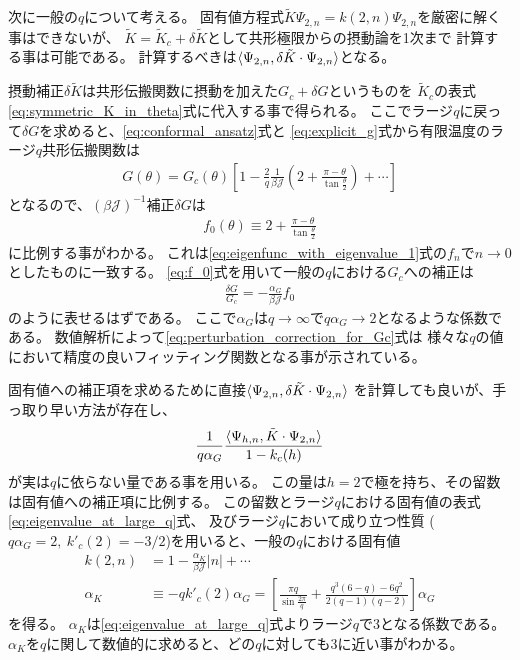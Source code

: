 次に一般の$q$について考える。
固有値方程式$\tilde{K} \Psi_{2,n} = k(2, n)\Psi_{2,n}$を厳密に解く事はできないが、
$\tilde{K} = \tilde{K}_c + \delta\tilde{K}$として共形極限からの摂動論を1次まで
計算する事は可能である。
計算するべきは$\langle \Psi_{2,n}, \delta\tilde{K}\cdot\Psi_{2,n} \rangle$となる。

摂動補正$\delta\tilde{K}$は共形伝搬関数に摂動を加えた$G_c + \delta G$というものを
$\tilde{K}_c$の表式\eqref{eq:symmetric_K_in_theta}式に代入する事で得られる。
ここでラージ$q$に戻って$\delta G$を求めると、\eqref{eq:conformal_ansatz}式と
\eqref{eq:explicit_g}式から有限温度のラージ$q$共形伝搬関数は
\begin{align}
	G(\theta) = G_c(\theta)\left[
		1 - \frac{2}{q}\frac{1}{\beta\mathcal{J}}
		\left(2 + \frac{\pi - \theta}{\tan\frac{\theta}{2}}\right) + \cdots
	\right]
\end{align}
となるので、$(\beta\mathcal{J})^{-1}$補正$\delta G$は
\begin{align}
	f_0(\theta) \equiv 2 + \frac{\pi - \theta}{\tan\frac{\theta}{2}}
	\label{eq:f_0}
\end{align}
に比例する事がわかる。
これは\eqref{eq:eigenfunc_with_eigenvalue_1}式の$f_n$で$n\to 0$としたものに一致する。
\eqref{eq:f_0}式を用いて一般の$q$における$G_c$への補正は
\begin{align}
	\frac{\delta G}{G_c} = -\frac{\alpha_G}{\beta\mathcal{J}}f_0
	\label{eq:perturbation_correction_for_Gc}
\end{align}
のように表せるはずである。
ここで$\alpha_G$は$q\to\infty$で$q\alpha_G\to 2$となるような係数である。
数値解析によって\eqref{eq:perturbation_correction_for_Gc}式は
様々な$q$の値において精度の良いフィッティング関数となる事が示されている\cite{maldacena}。

固有値への補正項を求めるために直接$\langle \Psi_{2,n}, \delta\tilde{K}\cdot\Psi_{2,n} \rangle$
を計算しても良いが、手っ取り早い方法が存在し、
\begin{align}
	\frac{1}{q\alpha_G}\frac{\langle \Psi_{h,n}, \tilde{K}\cdot\Psi_{2,n} \rangle}{1-k_c(h)}
\end{align}
が実は$q$に依らない量である事を用いる\cite{maldacena}。
この量は$h=2$で極を持ち、その留数は固有値への補正項に比例する。
この留数とラージ$q$における固有値の表式\eqref{eq:eigenvalue_at_large_q}式、
及びラージ$q$において成り立つ性質
($q\alpha_G = 2,\ k'_c(2) = -3/2$)を用いると、一般の$q$における固有値
\begin{align}
	k(2, n) &= 1 - \frac{\alpha_K}{\beta\mathcal{J}}|n| + \cdots\\
	\alpha_K &\equiv -qk'_c(2)\alpha_G
		= \left[
			\frac{\pi q}{\sin\frac{2\pi}{q}} + \frac{q^3(6-q) - 6q^2}{2(q-1)(q-2)}
		\right]\alpha_G
\end{align}
を得る。
$\alpha_K$は\eqref{eq:eigenvalue_at_large_q}式よりラージ$q$で3となる係数である。
$\alpha_K$を$q$に関して数値的に求めると、どの$q$に対しても3に近い事がわかる\cite{maldacena}。

